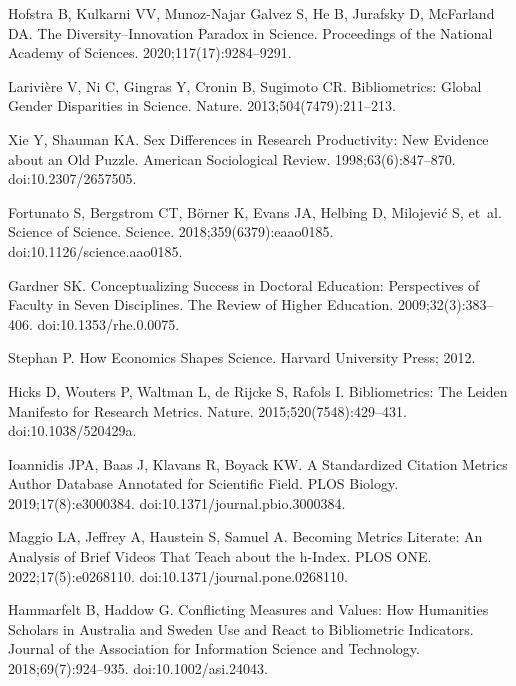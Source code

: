 \documentclass[
  10pt,
  letterpaper,
]{article}
\providecommand{\DIFaddend}{} %
\DeclareRobustCommand{\DIFaddend}{\DIFOaddend \let\includegraphics\DIFOincludegraphics} %
\begin{document}
\DIFaddend \begin{thebibliography}{10}

Hofstra B, Kulkarni VV, {Munoz-Najar Galvez} S, He B, Jurafsky D, McFarland DA.
\newblock The Diversity--Innovation Paradox in Science.
\newblock Proceedings of the National Academy of Sciences. 2020;117(17):9284--9291.

Larivi{\`e}re V, Ni C, Gingras Y, Cronin B, Sugimoto CR.
\newblock Bibliometrics: {{Global}} Gender Disparities in Science.
\newblock Nature. 2013;504(7479):211--213.

Xie Y, Shauman KA.
\newblock Sex {{Differences}} in {{Research Productivity}}: {{New Evidence}} about an {{Old Puzzle}}.
\newblock American Sociological Review. 1998;63(6):847--870.
\newblock doi:{10.2307/2657505}.

Fortunato S, Bergstrom CT, B{\"o}rner K, Evans JA, Helbing D, Milojevi{\'c} S, et~al.
\newblock Science of Science.
\newblock Science. 2018;359(6379):eaao0185.
\newblock doi:{10.1126/science.aao0185}.

Gardner SK.
\newblock Conceptualizing {{Success}} in {{Doctoral Education}}: {{Perspectives}} of {{Faculty}} in {{Seven Disciplines}}.
\newblock The Review of Higher Education. 2009;32(3):383--406.
\newblock doi:{10.1353/rhe.0.0075}.

Stephan P.
\newblock How Economics Shapes Science.
\newblock Harvard University Press; 2012.

Hicks D, Wouters P, Waltman L, {de Rijcke} S, Rafols I.
\newblock Bibliometrics: {{The Leiden Manifesto}} for Research Metrics.
\newblock Nature. 2015;520(7548):429--431.
\newblock doi:{10.1038/520429a}.

Ioannidis JPA, Baas J, Klavans R, Boyack KW.
\newblock A Standardized Citation Metrics Author Database Annotated for Scientific Field.
\newblock PLOS Biology. 2019;17(8):e3000384.
\newblock doi:{10.1371/journal.pbio.3000384}.

Maggio LA, Jeffrey A, Haustein S, Samuel A.
\newblock Becoming Metrics Literate: {{An}} Analysis of Brief Videos That Teach about the h-Index.
\newblock PLOS ONE. 2022;17(5):e0268110.
\newblock doi:{10.1371/journal.pone.0268110}.

Hammarfelt B, Haddow G.
\newblock Conflicting Measures and Values: {{How}} Humanities Scholars in {{Australia}} and {{Sweden}} Use and React to Bibliometric Indicators.
\newblock Journal of the Association for Information Science and Technology. 2018;69(7):924--935.
\newblock doi:{10.1002/asi.24043}.


\end{thebibliography}
\end{document}
